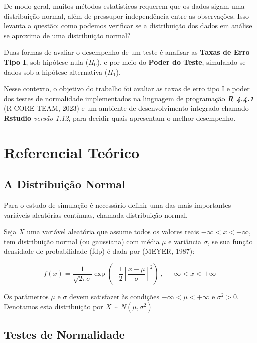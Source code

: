 \documentclass[a4paper,11pt]{article} %
\begin{document}
De modo geral, muitos métodos estatísticos requerem que os dados sigam uma distribuição normal, além de pressupor independência entre as observações. Isso levanta a questão: como podemos verificar se a distribuição dos dados em análise se aproxima de uma distribuição normal?\vskip0.3cm


Duas formas de avaliar o desempenho de um teste é analisar as \textbf{Taxas de Erro Tipo I}, sob hipótese nula ($H_0$), e por meio do \textbf{Poder do Teste}, simulando-se dados sob a hipótese alternativa ($H_1$). \vskip0.3cm

Nesse contexto, o objetivo do trabalho foi avaliar as taxas de erro tipo I e poder dos testes de normalidade implementados na linguagem de programação \textbf{\textit{R 4.4.1}} (R CORE TEAM, 2023) e um ambiente de desenvolvimento integrado chamado \textbf{Rstudio} \textit{versão 1.12}, para decidir quais apresentam o melhor desempenho.


\section{Referencial Teórico}
\subsection{A Distribuição Normal}

Para o estudo de simulação é necessário definir uma das mais importantes  variáveis aleatórias contínuas, chamada distribuição normal.\vskip0.3cm

Seja $X$ uma variável aleatória que assume todos os valores reais $- \infty < x < +\infty$, tem distribuição normal (ou gaussiana) com média $\mu$ e  variância $\sigma$, se sua função densidade de probabilidade (fdp) é dada por (MEYER, 1987):

\begin{equation}
f(x) = \frac{1}{\sqrt{2 \pi \sigma}} \exp \left(-\frac{1}{2} \left[\frac{x- \mu}{\sigma} \right]^{2} \right) \ , \ - \infty < x < +\infty
\end{equation}

Os parâmetros  $\mu$ e $\sigma$ devem satisfazer às condições  $-\infty < \mu < +\infty$ e $\sigma^{2} > 0$. Denotamos esta distribuição por $X \backsim N(\mu, \sigma^{2})$



\subsection{Testes de Normalidade}
\end{document}
